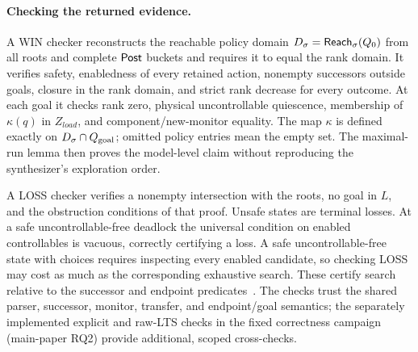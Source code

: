 \paragraph{Checking the returned evidence.}
A WIN checker reconstructs the reachable policy domain $D_\sigma=\mathsf{Reach}_\sigma(Q_0)$ from all roots and complete $\mathsf{Post}$ buckets and requires it to equal the rank domain. It verifies safety, enabledness of every retained action, nonempty successors outside goals, closure in the rank domain, and strict rank decrease for every outcome. At each goal it checks rank zero, physical uncontrollable quiescence, membership of $\kappa(q)$ in $Z_{load}$, and component/new-monitor equality. The map $\kappa$ is defined exactly on $D_\sigma\cap Q_{\mathrm{goal}}$; omitted policy entries mean the empty set. The maximal-run lemma then proves the model-level claim without reproducing the synthesizer's exploration order.

A LOSS checker verifies a nonempty intersection with the roots, no goal in $L$, and the obstruction conditions of that proof. Unsafe states are terminal losses. At a safe uncontrollable-free deadlock the universal condition on enabled controllables is vacuous, correctly certifying a loss. A safe uncontrollable-free state with choices requires inspecting every enabled candidate, so checking LOSS may cost as much as the corresponding exhaustive search. These certify search relative to the successor and endpoint predicates~\cite{HofmannEtAl2016MuCertificates}. The checks trust the shared parser, successor, monitor, transfer, and endpoint/goal semantics; the separately implemented explicit and raw-LTS checks in the fixed correctness campaign (main-paper RQ2) provide additional, scoped cross-checks.

